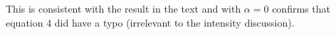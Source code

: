 This is consistent with the result in the text and with $\alpha = 0$ confirms that equation 4 did have a typo (irrelevant to the
intensity discussion).


%
%

%

